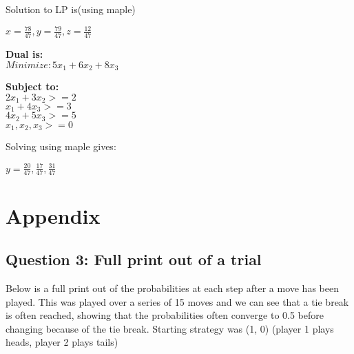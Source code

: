 \documentclass[11pt]{article}
\begin{document}
Solution to LP is(using maple)
\begin{center}
$x = \frac{78}{47}, y = \frac{79}{47}, z = \frac{12}{47}$
\end{center}

\textbf{Dual is:} \\
$Minimize: 5x_{1} + 6x_{2} + 8x_{3}$\\
\begin{center}
\textbf{Subject to:} \\
$2x_{1} + 3x_{2} >= 2$\\
$x_{1} + 4x_{3} >= 3$\\
$4x_{2} + 5x_{3} >= 5$ \\
$x_{1}, x_{2}, x_{3} >= 0$
\end{center}

Solving using maple gives:

\begin{center}
$ y = \frac{20}{47}, \frac{17}{47}, \frac{31}{47}$
\end{center}

\section{Appendix}

\subsection{Question 3: Full print out of a trial}
Below is a full print out of the probabilities at each step after a move has been played. This was played over a series of 15 moves and we can see that a tie break is often reached, showing that the probabilities often converge to 0.5 before changing because of the tie break. Starting strategy was (1, 0) (player 1 plays heads, player 2 plays tails) \\
\end{document}
